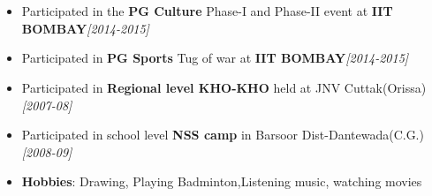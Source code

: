 \\[-0.9cm]\\
\begin{itemize}
        \item Participated in the \textbf{PG Culture} Phase-I and Phase-II event at \textbf{IIT BOMBAY}\hfill \emph{[2014-2015]} \\[-0.6cm]
	\item Participated in \textbf{PG Sports} Tug of war at \textbf{IIT BOMBAY}\hfill \emph{[2014-2015]}\\[-0.6cm]
	\item Participated in \textbf{Regional level KHO-KHO} held at JNV Cuttak(Orissa) \hfill \emph{[2007-08]} \\[-0.6cm]
	\item Participated in school level \textbf{NSS camp} in Barsoor Dist-Dantewada(C.G.)\hfill \emph{[2008-09]} \\[-0.6cm]
	\item \textbf{Hobbies}: Drawing, Playing Badminton,Listening music, watching movies \\[-0.4cm]
\end{itemize}
	
